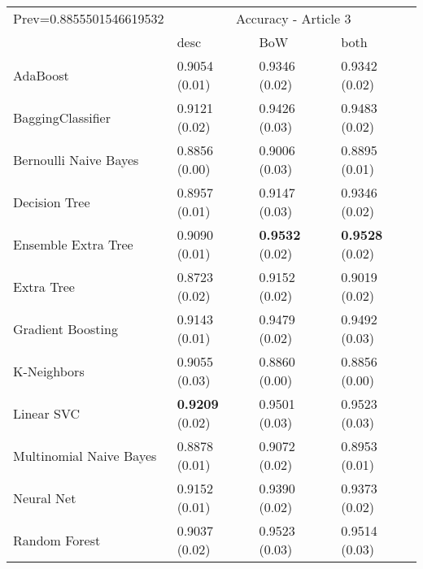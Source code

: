 \begin{tabular}{|l|l|l|l| }
\hline
Prev=0.8855501546619532 &  \multicolumn{3}{c|}{Accuracy - Article 3} \\
\cline{2-4} & desc & BoW & both \\ \hline
AdaBoost                & 0.9054 (0.01) & 0.9346 (0.02) & 0.9342 (0.02)\\
BaggingClassifier       & 0.9121 (0.02) & 0.9426 (0.03) & 0.9483 (0.02)\\
Bernoulli Naive Bayes   & 0.8856 (0.00) & 0.9006 (0.03) & 0.8895 (0.01)\\
Decision Tree           & 0.8957 (0.01) & 0.9147 (0.03) & 0.9346 (0.02)\\
Ensemble Extra Tree     & 0.9090 (0.01) & {\bf 0.9532} (0.02) & {\bf 0.9528} (0.02)\\
Extra Tree              & 0.8723 (0.02) & 0.9152 (0.02) & 0.9019 (0.02)\\
Gradient Boosting       & 0.9143 (0.01) & 0.9479 (0.02) & 0.9492 (0.03)\\
K-Neighbors             & 0.9055 (0.03) & 0.8860 (0.00) & 0.8856 (0.00)\\
Linear SVC              & {\bf 0.9209} (0.02) & 0.9501 (0.03) & 0.9523 (0.03)\\
Multinomial Naive Bayes & 0.8878 (0.01) & 0.9072 (0.02) & 0.8953 (0.01)\\
Neural Net              & 0.9152 (0.01) & 0.9390 (0.02) & 0.9373 (0.02)\\
Random Forest           & 0.9037 (0.02) & 0.9523 (0.03) & 0.9514 (0.03)\\
\hline
\end{tabular}